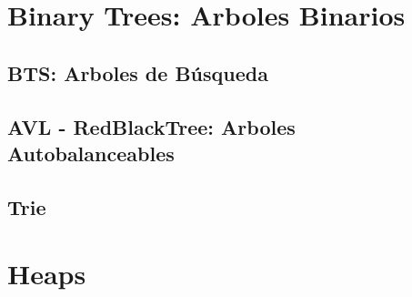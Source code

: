 \documentclass[12pt, fleqn]{report}                             %
\theoremstyle{break}                                            %
\begin{document}
    \clearpage
    \chapter{Binary Trees: Arboles Binarios}

        \section{BTS: Arboles de Búsqueda}

        \section{AVL - RedBlackTree: Arboles Autobalanceables}

        \section{Trie}

    \clearpage
    \chapter{Heaps}


    \clearpage
\end{document}
